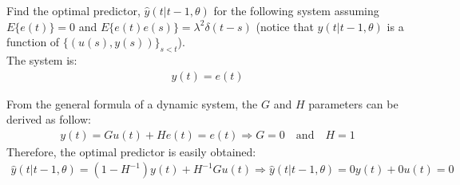 \Exercise[number={1}]
Find the optimal predictor, \(\hat{y}(t|t-1,\theta)\) for the following
system assuming \(E\{e(t)\}=0\) and \(E\{e(t)e(s)\}=\lambda^2\delta(t-s)\)
(notice that \(y(t|t-1,\theta)\) is a function of \(\{(u(s),y(s))\}_{s<t}\)).\\
The system is:
\begin{align*}
    y(t)=e(t)
\end{align*}

\Answer[number={1}]
From the general formula of a dynamic system, the \(G\) and \(H\)
parameters can be derived as follow:
\begin{align*}
    y(t)=Gu(t)+He(t)=e(t)
    \Rightarrow
    G=0 \quad\text{and}\quad H=1
\end{align*}
Therefore, the optimal predictor is easily obtained:
\begin{align*}
    \hat{y}(t|t-1,\theta) = (1-H^{-1})y(t)+H^{-1}Gu(t)
    \Rightarrow
    \hat{y}(t|t-1,\theta) = 0y(t)+0u(t)=0
\end{align*}